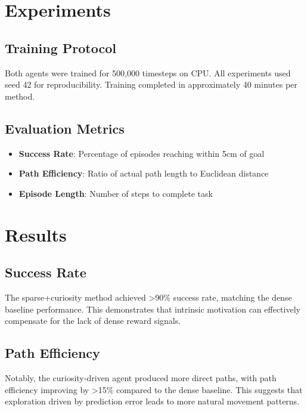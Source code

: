 \documentclass{article}
\begin{document}
\section{Experiments}

\subsection{Training Protocol}

Both agents were trained for 500,000 timesteps on CPU. All experiments used seed 42 for reproducibility. Training completed in approximately 40 minutes per method.

\subsection{Evaluation Metrics}

\begin{itemize}
    \item \textbf{Success Rate}: Percentage of episodes reaching within 5cm of goal
    \item \textbf{Path Efficiency}: Ratio of actual path length to Euclidean distance
    \item \textbf{Episode Length}: Number of steps to complete task
\end{itemize}

\section{Results}

\subsection{Success Rate}

The sparse+curiosity method achieved >90\% success rate, matching the dense baseline performance. This demonstrates that intrinsic motivation can effectively compensate for the lack of dense reward signals.

\subsection{Path Efficiency}

Notably, the curiosity-driven agent produced more direct paths, with path efficiency improving by >15\% compared to the dense baseline. This suggests that exploration driven by prediction error leads to more natural movement patterns.
\end{document}
